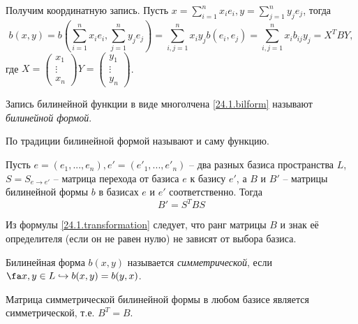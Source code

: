   Получим координатную запись. Пусть $x=\sum\limits_{i=1}^nx_ie_i,y=\sum\limits_{j=1}^ny_je_j$, тогда
  \begin{equation}\label{24.1.bilform}
  b(x,y)=b(\sum_{i=1}^nx_ie_i,\sum_{j=1}^ny_je_j)=\sum_{i,j=1}^nx_iy_jb(e_i,e_j)=\sum_{i,j=1}^nx_ib_{ij}y_j=X^TBY,
  \end{equation}
где $X=\begin{pmatrix}
x_1 \\ \vdots \\ x_n
\end{pmatrix} Y=\begin{pmatrix}
y_1 \\ \vdots \\ y_n
\end{pmatrix}$.
  \begin{defn}
  Запись билинейной функции в виде многолчена \eqref{24.1.bilform} называют \textit{билинейной формой}.
  \begin{notion} По традиции билинейной формой называют и саму функцию.
  \end{notion}
  \end{defn}
  \begin{stt}
  Пусть $e=(e_1,...,e_n), e'=(e'_1,...,e'_n)$ -- два разных базиса пространства $L$, $S=S_{e\rightarrow e'}$ -- матрица перехода от базиса $e$ к базису $e'$, а $B$ и $B'$ -- матрицы билинейной формы $b$ в базисах $e$ и $e'$ соответственно. Тогда 
  \begin{equation}\label{24.1.transformation}
  B'=S^TBS
  \end{equation}
  
  \end{stt}
  Из формулы \eqref{24.1.transformation} следует, что ранг матрицы $B$ и знак её определителя (если он не равен нулю) не зависят от выбора базиса.
  \begin{defn}
  Билинейная форма $b(x,y)$ называется \textit{симметрической}, если $\fa x,y \in L \hookrightarrow b(x,y)=b(y,x)$.
  \end{defn}
  \begin{stt}
  Матрица симметрической билинейной формы в любом базисе является симметрической, т.е. $B^T=B$.
  \end{stt}
  
